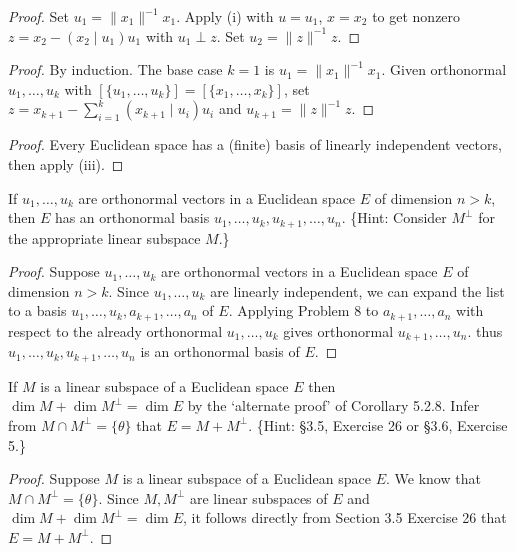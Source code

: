 \begin{proof}
    Set $u_1 = \|x_1\|^{-1}x_1$. 
    Apply (i) with $u = u_1$, $x = x_2$ 
        to get nonzero $z = x_2 - (x_2 \mid u_1)u_1$ with $u_1 \perp z$. 
    Set $u_2 = \|z\|^{-1}z$.
\end{proof}

\begin{proof}
    By induction. 
    The base case $k=1$ is $u_1 = \|x_1\|^{-1}x_1$. 
    Given orthonormal $u_1,\ldots,u_k$ 
        with $[\{u_1,\ldots,u_k\}]=[\{x_1,\ldots,x_k\}]$, 
        set $z = x_{k+1} - \sum_{i=1}^k (x_{k+1}\mid u_i)u_i$ 
        and $u_{k+1} = \|z\|^{-1}z$.
\end{proof}

\begin{proof}
    Every Euclidean space has a 
        (finite) basis of linearly independent vectors, then apply (iii).
\end{proof}

\begin{tcolorbox}[title=Problem 13, breakable]
If $u_1, \ldots, u_k$ are orthonormal vectors in a Euclidean space $E$ of dimension $n > k$, then $E$ has an orthonormal basis $u_1, \ldots, u_k, u_{k+1}, \ldots, u_n$. \{Hint: Consider $M^\perp$ for the appropriate linear subspace $M$.\}
\end{tcolorbox}

\begin{proof}
    Suppose $u_1, \ldots, u_k$
        are orthonormal vectors in a Euclidean space $E$ of dimension $n > k$.
    Since $u_1, \ldots, u_k$ are linearly independent,
        we can expand the list to a basis $u_1, \ldots, u_k, a_{k+1}, \ldots, a_n$ of $E$.
    Applying Problem 8 to $a_{k+1}, \ldots, a_n$ with respect to the already orthonormal $u_1, \ldots, u_k$ gives orthonormal $u_{k+1}, \ldots, u_n$.
    thus $u_1, \ldots, u_k, u_{k+1}, \ldots, u_n$ is an orthonormal basis of $E$.
\end{proof}

\begin{tcolorbox}[title=Problem 14, breakable]
If $M$ is a linear subspace of a 
Euclidean space $E$ then $\dim M + \dim M^\perp = \dim E$ 
by the `alternate proof' of Corollary 5.2.8. 
Infer from $M \cap M^\perp = \{\theta\}$ that $E = M + M^\perp$. \{Hint: \S3.5, Exercise 26 or \S3.6, Exercise 5.\}
\end{tcolorbox}

\begin{proof}
    Suppose $M$ is a linear subspace of a Euclidean space $E$.
    We know that $M \cap M^\perp = \{\theta\}$.
    Since $M, M^\perp$ are linear subspaces of $E$ and $\dim M + \dim M^\perp = \dim E$, 
    it follows directly from Section 3.5 Exercise 26 that $E = M + M^\perp$.
\end{proof}

